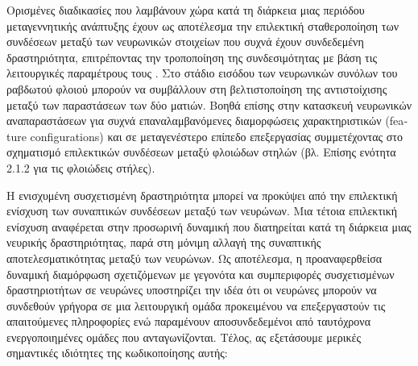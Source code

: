\documentclass[12pt]{report}
\begin{document}
Ορισμένες διαδικασίες που λαμβάνουν χώρα κατά τη διάρκεια μιας περιόδου μεταγεννητικής ανάπτυξης έχουν ως αποτέλεσμα την επιλεκτική σταθεροποίηση των συνδέσεων μεταξύ των νευρωνικών στοιχείων που συχνά έχουν συνδεδεμένη δραστηριότητα, επιτρέποντας την τροποποίηση της συνδεσιμότητας με βάση τις λειτουργικές παραμέτρους τους \cite{singer1990}. Στο στάδιο εισόδου των νευρωνικών συνόλων του ραβδωτού φλοιού μπορούν να συμβάλλουν στη βελτιστοποίηση της αντιστοίχισης μεταξύ των παραστάσεων των δύο ματιών. Βοηθά επίσης στην κατασκευή νευρωνικών αναπαραστάσεων για συχνά επαναλαμβανόμενες διαμορφώσεις χαρακτηριστικών (\textlatin{feature configurations}) και σε μεταγενέστερο επίπεδο επεξεργασίας συμμετέχοντας στο σχηματισμό επιλεκτικών συνδέσεων μεταξύ φλοιώδων στηλών (βλ. Επίσης ενότητα 2.1.2 για τις φλοιώδεις στήλες).

Η ενισχυμένη συσχετισμένη δραστηριότητα μπορεί να προκύψει από την επιλεκτική ενίσχυση των συναπτικών συνδέσεων μεταξύ των νευρώνων. Μια τέτοια επιλεκτική ενίσχυση αναφέρεται στην προσωρινή δυναμική που διατηρείται κατά τη διάρκεια μιας νευρικής δραστηριότητας, παρά στη μόνιμη αλλαγή της συναπτικής αποτελεσματικότητας μεταξύ των νευρώνων. Ως αποτέλεσμα, η προαναφερθείσα δυναμική διαμόρφωση σχετιζόμενων με γεγονότα και συμπεριφορές συσχετισμένων δραστηριοτήτων σε νευρώνες υποστηρίζει την ιδέα ότι οι νευρώνες μπορούν να συνδεθούν γρήγορα σε μια λειτουργική ομάδα προκειμένου να επεξεργαστούν τις απαιτούμενες πληροφορίες ενώ παραμένουν αποσυνδεδεμένοι από ταυτόχρονα ενεργοποιημένες ομάδες που ανταγωνίζονται. Τέλος, ας εξετάσουμε μερικές σημαντικές ιδιότητες της κωδικοποίησης αυτής:
\end{document}
